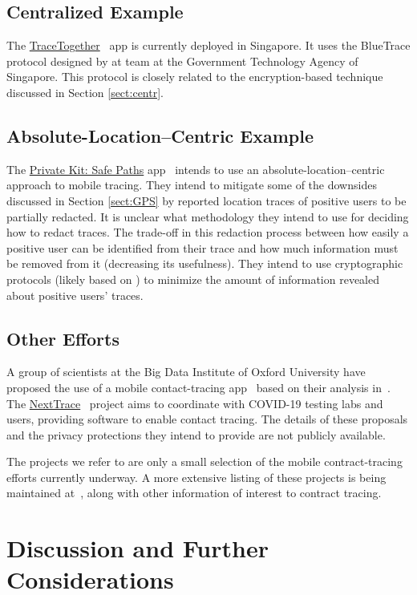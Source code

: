 \subsection{Centralized Example}
The \href{https://www.tracetogether.gov.sg/}{TraceTogether}~\cite{tracetogether} app is currently deployed in Singapore.
It uses the BlueTrace protocol designed by at team at the Government Technology Agency of Singapore.
This protocol is closely related to the encryption-based technique discussed in Section \ref{sect:centr}.

\subsection{Absolute-Location--Centric Example}
The \href{http://safepaths.mit.edu/}{Private Kit: Safe Paths} app~\cite{safepaths,safepaths2} intends to use an absolute-location--centric approach to mobile tracing.
They intend to mitigate some of the downsides discussed in Section \ref{sect:GPS} by reported location traces of positive users to be partially redacted.
It is unclear what methodology they intend to use for deciding how to redact traces. The trade-off in this redaction process between how easily a positive user can be identified from their trace and how much information must be removed from it (decreasing its usefulness). 
They intend to use cryptographic protocols (likely based on \cite{safepathsmaybe}) to minimize the amount of information revealed about positive users' traces.

\subsection{Other Efforts}
A group of scientists at the Big Data Institute of Oxford University have proposed the use of a mobile contact-tracing app~\cite{oxford,oxford2} based on their analysis in~\cite{oxford3}.
The \href{https://nexttrace.org/}{NextTrace}~\cite{nexttrace} project aims to coordinate with COVID-19 testing labs and users, providing software to enable contact tracing.
The details of these proposals and the privacy protections they intend to provide are not publicly available.

The projects we refer to are only a small selection of the mobile contract-tracing efforts currently underway.
A more extensive listing of these projects is being maintained at~\cite{gdoc}, along with other information of interest to contract tracing.

\section{Discussion and Further Considerations}


